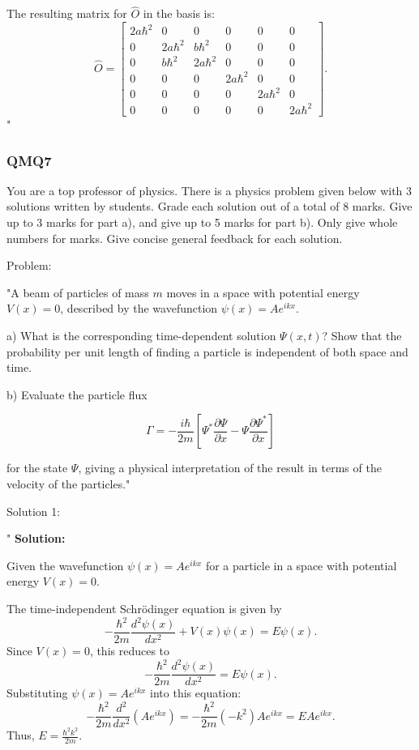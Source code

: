 The resulting matrix for $\hat{O}$ in the basis is:
\[
\hat{O} = 
\begin{bmatrix}
2a\hbar^2 & 0 & 0 & 0 & 0 & 0 \\
0 & 2a\hbar^2 & b\hbar^2 & 0 & 0 & 0 \\
0 & b\hbar^2 & 2a\hbar^2 & 0 & 0 & 0 \\
0 & 0 & 0 & 2a\hbar^2 & 0 & 0 \\
0 & 0 & 0 & 0 & 2a\hbar^2 & 0 \\
0 & 0 & 0 & 0 & 0 & 2a\hbar^2
\end{bmatrix}.
\]
"

\subsubsection{QMQ7}

You are a top professor of physics. There is a physics problem given below with 3 solutions written by students. Grade each solution out of a total of 8 marks. Give up to 3 marks for part a), and give up to 5 marks for part b). Only give whole numbers for marks. Give concise general feedback for each solution. 

Problem:

"A beam of particles of mass \( m \) moves in a space with potential energy \( V(x) = 0 \), described by the wavefunction \( \psi(x) = Ae^{ikx} \).

a) What is the corresponding time-dependent solution \( \Psi(x,t) \)? Show that the probability per unit length of finding a particle is independent of both space and time.

b) Evaluate the particle flux 

\[ \Gamma = -\frac{i\hbar}{2m}\left[ \Psi^{*}\frac{\partial\Psi}{\partial x} - \Psi\frac{\partial\Psi^{*}}{\partial x} \right] \]

for the state \( \Psi \), giving a physical interpretation of the result in terms of the velocity of the particles."

Solution 1: 

"
\textbf{Solution:}  

Given the wavefunction $\psi(x) = A e^{ikx}$ for a particle in a space with potential energy $V(x) = 0$.  

The time-independent Schrödinger equation is given by  
\[
-\frac{\hbar^2}{2m} \frac{d^2 \psi(x)}{dx^2} + V(x)\psi(x) = E\psi(x).
\]  
Since $V(x) = 0$, this reduces to  
\[
-\frac{\hbar^2}{2m} \frac{d^2 \psi(x)}{dx^2} = E\psi(x).
\]  
Substituting $\psi(x) = A e^{ikx}$ into this equation:  
\[
-\frac{\hbar^2}{2m} \frac{d^2}{dx^2}\left(A e^{ikx}\right) = -\frac{\hbar^2}{2m}(-k^2)A e^{ikx} = E A e^{ikx}.
\]  
Thus, $E = \frac{\hbar^2 k^2}{2m}$.  


